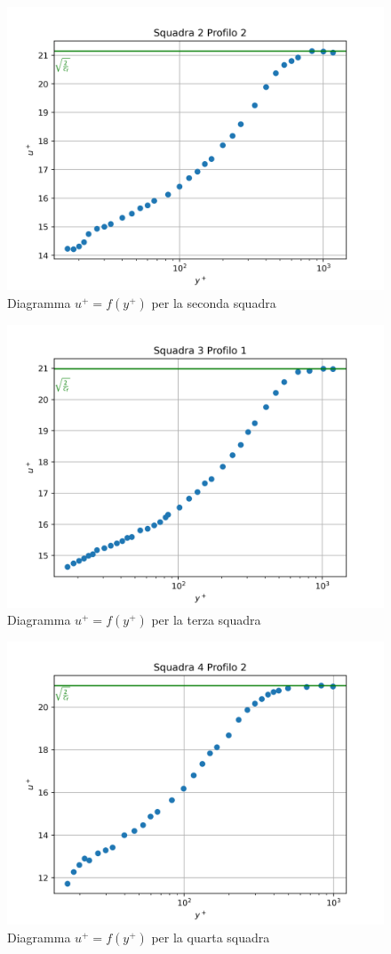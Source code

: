 \begin{figure}[H]
    \centering
    \includegraphics[width=.85\textwidth]{images/9/sq2p2+.png}
    \caption{Diagramma $u^+=f(y^+)$ per la seconda squadra}
\end{figure}

\begin{figure}[H]
    \centering
    \includegraphics[width=.85\textwidth]{images/9/sq3p1+.png}
    \caption{Diagramma $u^+=f(y^+)$ per la terza squadra}
\end{figure}

\begin{figure}[H]
    \centering
    \includegraphics[width=.8\textwidth]{images/9/sq4p2+.png}
    \caption{Diagramma $u^+=f(y^+)$ per la quarta squadra}
\end{figure}

